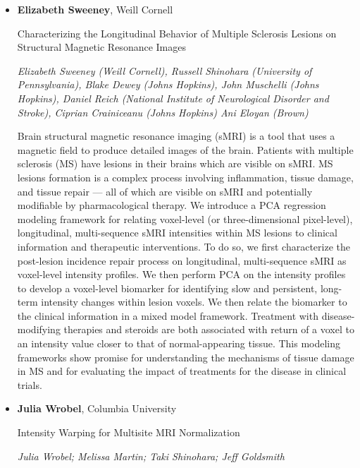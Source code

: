 \begin{itemize}
\item \textbf{Elizabeth Sweeney}, Weill Cornell

Characterizing the Longitudinal Behavior of Multiple Sclerosis Lesions on Structural Magnetic Resonance Images

\emph{\footnotesize Elizabeth Sweeney (Weill Cornell), Russell Shinohara (University of Pennsylvania), Blake Dewey (Johns Hopkins), John Muschelli (Johns Hopkins), Daniel Reich (National Institute of Neurological Disorder and Stroke), Ciprian Crainiceanu (Johns Hopkins) Ani Eloyan (Brown)}

Brain structural magnetic resonance imaging (sMRI) is a tool that uses a magnetic field to produce detailed images of the brain. Patients with multiple sclerosis (MS) have lesions in their brains which are visible on sMRI. MS lesions formation is a complex process involving inflammation, tissue damage, and tissue repair — all of which are visible on sMRI and potentially modifiable by pharmacological therapy. We introduce a PCA regression modeling framework for relating voxel-level (or three-dimensional pixel-level), longitudinal, multi-sequence sMRI intensities within MS lesions to clinical information and therapeutic interventions. To do so, we first characterize the post-lesion incidence repair process on longitudinal, multi-sequence sMRI as voxel-level intensity profiles. We then perform PCA on the intensity profiles to develop a voxel-level biomarker for identifying slow and persistent, long-term intensity changes within lesion voxels. We then relate the biomarker to the clinical information in a mixed model framework. Treatment with disease-modifying therapies and steroids are both associated with return of a voxel to an intensity value closer to that of normal-appearing tissue. This modeling frameworks show promise for understanding the mechanisms of tissue damage in MS and for evaluating the impact of treatments for the disease in clinical trials.


\item \textbf{Julia Wrobel}, Columbia University

Intensity Warping for Multisite MRI Normalization

\emph{\footnotesize Julia Wrobel; Melissa Martin; Taki Shinohara; Jeff Goldsmith}


\end{itemize}
